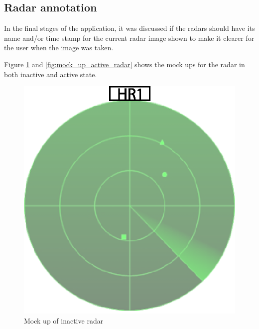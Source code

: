\subsection{Radar annotation}
In the final stages of the application, it was discussed if the radars should have its name and/or time stamp for the current radar image shown to make it clearer for the user when the image was taken.

Figure \ref{fig:mock_up_inactive_radar} and \ref{fig:mock_up_active_radar} shows the mock ups for the radar in both inactive and active state.
\begin{figure}[htbp]
  \begin{minipage}[b]{0.5\linewidth}
    \centering
    \includegraphics[width=\linewidth]{figure/radar1.eps}
    \caption{Mock up of inactive radar}
    \label{fig:mock_up_inactive_radar}
  \end{minipage}
  \hspace{0.5cm}
  \begin{minipage}[b]{0.5\linewidth}
    \centering

\end{minipage}
\end{figure}
